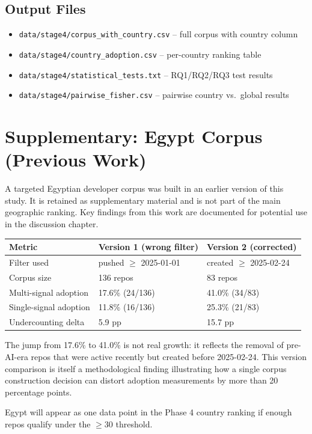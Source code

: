 \documentclass[12pt,a4paper]{article}
\begin{document}
\subsection{Output Files}
\begin{itemize}
  \item \texttt{data/stage4/corpus\_with\_country.csv} -- full corpus with country column
  \item \texttt{data/stage4/country\_adoption.csv} -- per-country ranking table
  \item \texttt{data/stage4/statistical\_tests.txt} -- RQ1/RQ2/RQ3 test results
  \item \texttt{data/stage4/pairwise\_fisher.csv} -- pairwise country vs.\ global results
\end{itemize}

\section{Supplementary: Egypt Corpus (Previous Work)}

A targeted Egyptian developer corpus was built in an earlier version of this study.
It is retained as supplementary material and is not part of the main geographic ranking.
Key findings from this work are documented for potential use in the discussion chapter.

\begin{table}[h]
\centering
\begin{tabular}{@{}lll@{}}
\toprule
Metric & Version 1 (wrong filter) & Version 2 (corrected) \\
\midrule
Filter used            & pushed $\geq$ 2025-01-01    & created $\geq$ 2025-02-24 \\
Corpus size            & 136 repos                   & 83 repos \\
Multi-signal adoption  & 17.6\% (24/136)             & 41.0\% (34/83) \\
Single-signal adoption & 11.8\% (16/136)             & 25.3\% (21/83) \\
Undercounting delta    & 5.9 pp                      & 15.7 pp \\
\bottomrule
\end{tabular}
\end{table}

The jump from 17.6\% to 41.0\% is not real growth: it reflects the removal of
pre-AI-era repos that were active recently but created before 2025-02-24. This version
comparison is itself a methodological finding illustrating how a single corpus
construction decision can distort adoption measurements by more than 20 percentage points.

Egypt will appear as one data point in the Phase 4 country ranking if enough repos
qualify under the $\geq$30 threshold.
\end{document}
